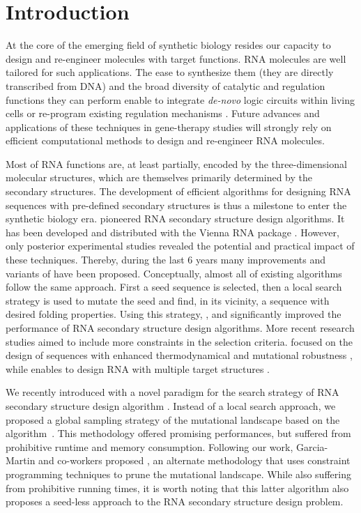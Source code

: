 \section{Introduction}
\label{sec:introduction}

At the core of the emerging field of synthetic biology resides our capacity to design and re-engineer molecules with target functions. RNA molecules are well tailored for such applications. The ease to synthesize them (they are directly transcribed from DNA) and the broad diversity of catalytic and regulation functions they can perform enable to integrate \textit{de-novo} logic  circuits within living cells \cite{Rodrigo:2012fk} or re-program existing regulation mechanisms \cite{Chang:2012uq}. Future advances and applications of these techniques in gene-therapy studies will strongly rely on efficient computational methods to design and re-engineer RNA molecules.

Most of RNA functions are, at least partially, encoded by the three-dimensional molecular structures, which are themselves primarily determined by the secondary structures. The development of efficient algorithms for designing RNA sequences with pre-defined secondary structures is thus a milestone to enter the synthetic biology era. \RNAinverse pioneered RNA secondary structure design algorithms. It has been developed and distributed with the Vienna RNA package \cite{Hofacker:1994}. However, only posterior experimental studies revealed the potential and practical impact of these techniques. Thereby, during the last 6 years many improvements and variants of \RNAinverse have been proposed. Conceptually, almost all of existing algorithms follow the same approach. First a seed sequence is selected, then a local search strategy is used to mutate the seed and find, in its vicinity, a sequence with desired folding properties. Using this strategy, \INFORNA \cite{Busch:2006uq}, \RNASSD \cite{Aguirre-Hernandez:2007kx} and \NUPACK \cite{Zadeh:2011fk} significantly improved the performance of RNA secondary structure design algorithms. More recent research studies aimed to include more constraints in the selection criteria. \RNAexinv focused on the design of sequences with enhanced thermodynamical and mutational robustness \cite{Avihoo:2011fk}, while \frankenstein enables to design RNA with multiple target structures \cite{Lyngso:2012vn}.

We recently introduced with \RNAensign a novel paradigm for the search strategy of RNA secondary structure design algorithm \cite{Levin:2012kx}. Instead of a local search approach, we proposed a global sampling strategy of the mutational landscape based on the \RNAmutants algorithm~\cite{Waldispuhl2008}. This methodology offered promising performances, but suffered from  prohibitive runtime and memory consumption. Following our work, Garcia-Martin and co-workers proposed \RNAiFOLD, an alternate methodology that uses constraint programming techniques to prune the mutational landscape. While also suffering from prohibitive running times, it is worth noting that this latter algorithm also proposes a seed-less approach to the RNA secondary structure design problem.

